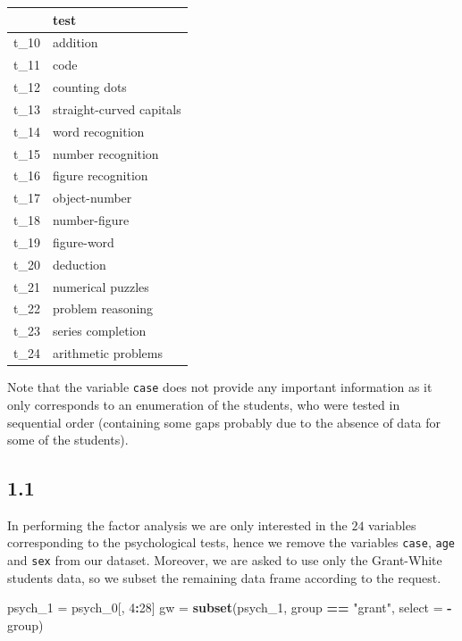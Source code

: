 \documentclass[
]{article}
\newenvironment{Shaded}{\begin{snugshade}}{\end{snugshade}}
\newcommand{\AttributeTok}[1]{\textcolor[rgb]{0.13,0.29,0.53}{#1}}
\newcommand{\DecValTok}[1]{\textcolor[rgb]{0.00,0.00,0.81}{#1}}
\newcommand{\FunctionTok}[1]{\textcolor[rgb]{0.13,0.29,0.53}{\textbf{#1}}}
\newcommand{\NormalTok}[1]{#1}
\newcommand{\OtherTok}[1]{\textcolor[rgb]{0.56,0.35,0.01}{#1}}
\newcommand{\SpecialCharTok}[1]{\textcolor[rgb]{0.81,0.36,0.00}{\textbf{#1}}}
\newcommand{\StringTok}[1]{\textcolor[rgb]{0.31,0.60,0.02}{#1}}
\theoremstyle{plain}
\begin{document}
\begin{longtable}[]{@{}ll@{}}
\toprule\noalign{}
& test \\
\midrule\noalign{}
\endhead
\bottomrule\noalign{}
\endlastfoot
t\_10 & addition \\
t\_11 & code \\
t\_12 & counting dots \\
t\_13 & straight-curved capitals \\
t\_14 & word recognition \\
t\_15 & number recognition \\
t\_16 & figure recognition \\
t\_17 & object-number \\
t\_18 & number-figure \\
t\_19 & figure-word \\
t\_20 & deduction \\
t\_21 & numerical puzzles \\
t\_22 & problem reasoning \\
t\_23 & series completion \\
t\_24 & arithmetic problems \\
\end{longtable}

\vspace{-12pt}

Note that the variable \texttt{case} does not provide any important
information as it only corresponds to an enumeration of the students,
who were tested in sequential order (containing some gaps probably due
to the absence of data for some of the students).

\hypertarget{section}{%
\subsection{1.1}\label{section}}

In performing the factor analysis we are only interested in the \(24\)
variables corresponding to the psychological tests, hence we remove the
variables \texttt{case}, \texttt{age} and \texttt{sex} from our dataset.
Moreover, we are asked to use only the Grant-White students data, so we
subset the remaining data frame according to the request.

\smallskip

\begin{Shaded}
\begin{Highlighting}[]
\NormalTok{psych\_1 }\OtherTok{=}\NormalTok{ psych\_0[, }\DecValTok{4}\SpecialCharTok{:}\DecValTok{28}\NormalTok{]}
\NormalTok{gw }\OtherTok{=} \FunctionTok{subset}\NormalTok{(psych\_1, group }\SpecialCharTok{==} \StringTok{"grant"}\NormalTok{, }\AttributeTok{select =} \SpecialCharTok{{-}}\NormalTok{group)}
\end{Highlighting}
\end{Shaded}
\end{document}

